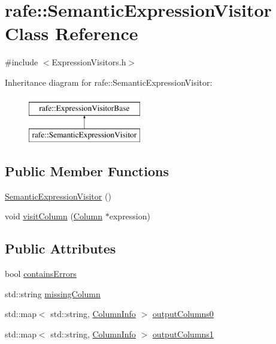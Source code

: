\hypertarget{classrafe_1_1_semantic_expression_visitor}{\section{rafe\+:\+:Semantic\+Expression\+Visitor Class Reference}
\label{classrafe_1_1_semantic_expression_visitor}
}


{\ttfamily \#include $<$Expression\+Visitors.\+h$>$}

Inheritance diagram for rafe\+:\+:Semantic\+Expression\+Visitor\+:\begin{figure}[H]
\begin{center}
\leavevmode
\includegraphics[height=2.000000cm]{classrafe_1_1_semantic_expression_visitor}
\end{center}
\end{figure}
\subsection*{Public Member Functions}
\begin{DoxyCompactItemize}
\item 
\hyperlink{classrafe_1_1_semantic_expression_visitor_a65471bea6ff7fd492e6fa1007afd8a3f}{Semantic\+Expression\+Visitor} ()
\item 
void \hyperlink{classrafe_1_1_semantic_expression_visitor_a605cf8d023dc621ac96d0b82d19d1b42}{visit\+Column} (\hyperlink{classrafe_1_1_column}{Column} $\ast$expression)
\end{DoxyCompactItemize}
\subsection*{Public Attributes}
\begin{DoxyCompactItemize}
\item 
bool \hyperlink{classrafe_1_1_semantic_expression_visitor_aa72ce27912618ac925527b410b35d2d8}{contains\+Errors}
\item 
std\+::string \hyperlink{classrafe_1_1_semantic_expression_visitor_ac50fe1acf73b917b780d2252d5ea1f69}{missing\+Column}
\item 
std\+::map$<$ std\+::string, \hyperlink{classrafe_1_1_column_info}{Column\+Info} $>$ \hyperlink{classrafe_1_1_semantic_expression_visitor_ae1fed8fcd45928b3a9479beb454f0b00}{output\+Columns0}
\item 
std\+::map$<$ std\+::string, \hyperlink{classrafe_1_1_column_info}{Column\+Info} $>$ \hyperlink{classrafe_1_1_semantic_expression_visitor_ac36701c0aab42b76a14bfba6c5355b6c}{output\+Columns1}
\end{DoxyCompactItemize}


